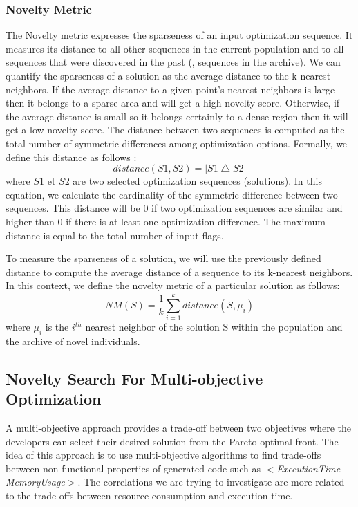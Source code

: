 \subsubsection{Novelty Metric}
The Novelty metric expresses the sparseness of an input optimization sequence. It measures its distance to all other sequences in the current population and to all sequences that were discovered in the past (\ie, sequences in the archive). 
We can quantify the sparseness of a solution as the average distance to the k-nearest neighbors. 
If the average distance to a given point's nearest neighbors is large then it belongs to a sparse area and will get a high novelty score. 
Otherwise, if the average distance is small so it belongs certainly to a dense region then it will get a low novelty score. 
The distance between two sequences is computed as the total number of symmetric differences among optimization options. Formally, we define this distance as follows :
\begin{equation}
distance(S1,S2)=\left | S1 \bigtriangleup S2 \right |
\end{equation}
where $S1$ et $S2$ are two selected optimization sequences (solutions). In this equation, we calculate the cardinality of the symmetric difference between two sequences. This distance will be 0 if two optimization sequences are similar and higher than 0 if there is at least one optimization difference. The maximum distance is equal to the total number of input flags.

To measure the sparseness of a solution, we will use the previously defined distance to compute the average distance of a sequence to its k-nearest neighbors. In this context, we define the novelty metric of a particular solution as follows:
\begin{equation}
NM(S) = \frac{1}{k} \sum_{i=1}^{k} distance(S,\mu _{i})
\end{equation}
where $\mu _{i}$ is the $i^{th}$ nearest neighbor of the solution S within the population and the archive of novel individuals. 

\subsection{Novelty Search For Multi-objective Optimization}
A multi-objective approach provides a trade-off between two objectives where the developers can select their desired solution from the Pareto-optimal front. The idea of this approach is to use multi-objective algorithms to find trade-offs between non-functional properties of generated code such as \textit{$<$ExecutionTime--MemoryUsage$>$}. The correlations we are trying to investigate are more related to the trade-offs between resource consumption and execution time.
  
